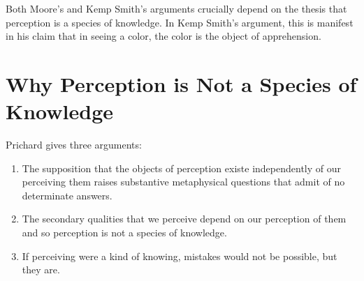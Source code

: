 \documentclass[11pt]{article}
\begin{document}
\begin{enumerate}
Both Moore's and Kemp Smith's arguments crucially depend on the thesis that perception is a species of knowledge. In Kemp Smith's argument, this is manifest in his claim that in seeing a color, the color is the object of apprehension.
\end{enumerate}

\section{Why Perception is Not a Species of Knowledge} %
\label{sec:why_perception_is_not_a_species_of_knowledge}
Prichard gives three arguments:
\begin{enumerate}
    \item The supposition that the objects of perception existe independently of our perceiving them raises substantive metaphysical questions that admit of no determinate answers.
    \item The secondary qualities that we perceive depend on our perception of them and so perception is not a species of knowledge.
    \item If perceiving were a kind of knowing, mistakes would not be possible, but they are.
\end{enumerate}
\end{document}
